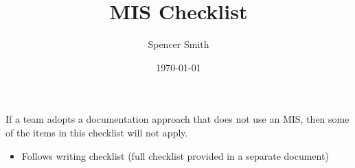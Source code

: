 \documentclass[12pt]{article}
\begin{document}
\title{MIS Checklist}
\author{Spencer Smith}
\date{\today}

\maketitle

If a team adopts a documentation approach that does not use an MIS, then some of
the items in this checklist will not apply.

\begin{itemize}

\item Follows writing checklist (full checklist provided in a separate document)


\end{itemize}
\end{document}
